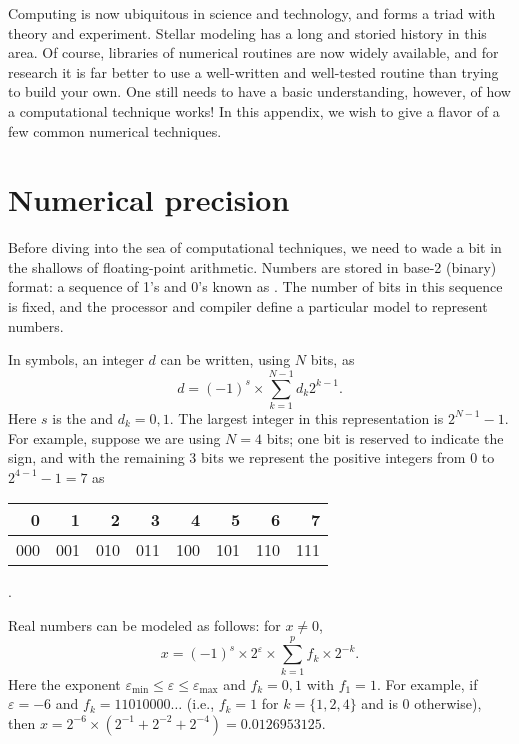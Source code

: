 Computing is now ubiquitous in science and technology, and forms a triad with theory and experiment. Stellar modeling has a long and storied history in this area. Of course, libraries of numerical routines are now widely available, and for research it is far better to use a well-written and well-tested routine than trying to build your own. One still needs to have a basic understanding, however, of how a computational technique works! In this appendix, we wish to give a flavor of a few common numerical techniques. 

\section{Numerical precision}\label{s.numerical-precision}
Before diving into the sea of computational techniques, we need to wade a bit in the shallows of floating-point arithmetic. Numbers are stored in base-2 (binary) format: a sequence of 1's and 0's known as . The number of bits in this sequence is fixed, and the processor and compiler define a particular model to represent numbers.

In symbols, an integer $d$ can be written, using $N$ bits, as
\[
d = (-1)^{s}\times\sum_{k=1}^{N-1} d_{k}2^{k-1}.
\]
Here $s$ is the  and $d_{k} = 0,1$. The largest integer in this representation is $2^{N-1}-1$. For example, suppose we are using $N=4$ bits; one bit is reserved to indicate the sign, and with the remaining 3 bits we represent the positive integers from $0$ to $2^{4-1}-1 = 7$ as
\begin{tabular}{rrrrrrrr}
0 & 1 & 2 & 3 & 4 & 5 & 6 & 7\\
\hline
000 & 001 & 010 & 011 & 100 & 101 & 110 & 111
\end{tabular}.

Real numbers can be modeled
as follows: for $x \neq 0$, 
\begin{equation}\label{e.modal-reals}
x = (-1)^{s}\times 2^{\varepsilon}\times \sum_{k=1}^{p} f_{k}\times 2^{-k}.
\end{equation}
Here the exponent $\varepsilon_{\min}\le\varepsilon\le\varepsilon_{\max}$ and $f_{k}=0,1$ with $f_{1} = 1$. For example, if $\varepsilon=-6$ and $f_{k} = 11010000\ldots$ (i.e., $f_{k}=1$ for $k=\{1,2,4\}$ and is 0 otherwise), then
$x = 2^{-6}\times (2^{-1}+2^{-2}+2^{-4}) = 0.0126953125$.

